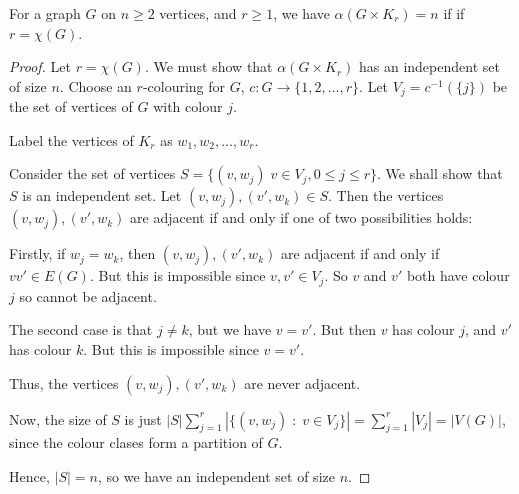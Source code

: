 \documentclass{unswmaths}
\begin{document}
\begin{lemma}[Part (b)]
\label{1b}
    For a graph $G$ on $n \geq 2$ vertices, and $r \geq 1$, we have
    $\alpha(G\times K_r) = n$ if if $r = \chi(G)$.
\end{lemma}
\begin{proof}
    Let $r = \chi(G)$. We must show that $\alpha(G\times K_r)$
    has an independent set of size $n$. Choose an $r$-colouring
    for $G$, $c:G\to \{1,2,\ldots,r\}$. Let $V_j = c^{-1}(\{j\})$
    be the set of vertices of $G$ with colour $j$.
       
    Label the vertices of $K_r$ as $w_1,w_2,\ldots, w_r$. 
    
    Consider the set of vertices $S = \{(v,w_j)\;v \in V_j, 0 \leq j \leq r\}$.
    We shall show that $S$ is an independent set. Let $(v,w_j), (v',w_k) \in S$. 
    Then the vertices $(v,w_j),(v',w_k)$ are adjacent if and only if one of
    two possibilities holds:
    
    Firstly, if $w_j = w_k$, then $(v,w_j),(v',w_k)$ are adjacent
    if and only if $vv' \in E(G)$. But this is impossible since $v,v' \in V_j$.
    So $v$ and $v'$ both have colour $j$ so cannot be adjacent.
    
    The second case is that $j \neq k$, but we have $v = v'$. But then
    $v$ has colour $j$, and $v'$ has colour $k$. But this is impossible
    since $v = v'$.
    
    Thus, the vertices $(v,w_j),(v',w_k)$ are never adjacent.
    
    Now, the size of $S$ is just $|S| \sum_{j = 1}^r |\{(v,w_j)\;:\;v \in V_j\}| = \sum_{j=1}^r |V_j| = |V(G)|$,
    since the colour clases form a partition of $G$.
    
    Hence, $|S| = n$, so we have an independent set of size $n$.    
\end{proof}
\end{document}
